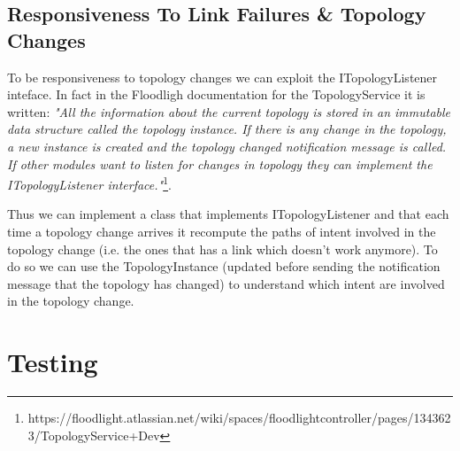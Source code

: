 \documentclass[a4paper]{report}
\begin{document}
	\section{Responsiveness To Link Failures \& Topology Changes}
	To be responsiveness to topology changes we can exploit the ITopologyListener inteface. In fact in the Floodligh documentation for the TopologyService it is written: \textit{"All the information about the current topology is stored in an immutable data structure called the topology instance. If there is any change in the topology, a new instance is created and the topology changed notification message is called. If other modules want to listen for changes in topology they can implement the ITopologyListener interface."}\footnote{https://floodlight.atlassian.net/wiki/spaces/floodlightcontroller/pages/1343623/TopologyService+Dev}.
	
	\noindent Thus we can implement a class that implements ITopologyListener and that each time a topology change arrives it recompute the paths of intent involved in the topology change (i.e. the ones that has a link which doesn't work anymore). To do so we can use the TopologyInstance (updated before sending the notification message that the topology has changed) to understand which intent are involved in the topology change.
	
	\chapter{Testing}
	
\end{document}
